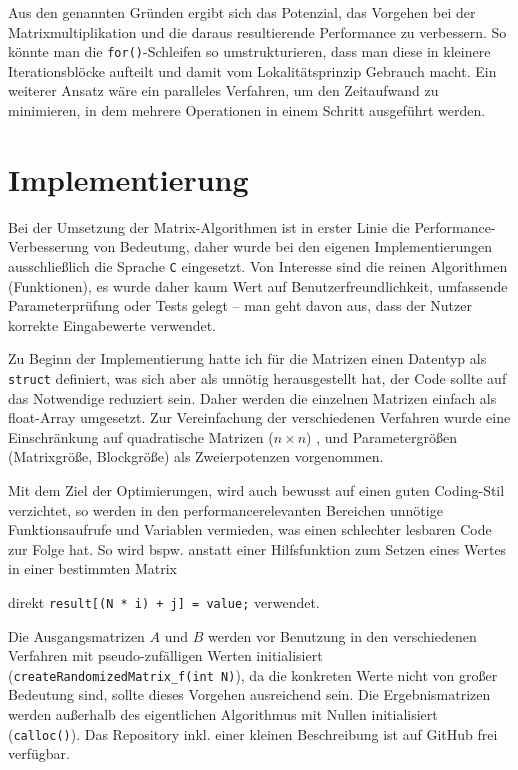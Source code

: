 \documentclass[a4paper,11pt]{scrartcl}
\newcommand{\bspw}{\mbox{bspw.}\xspace}
\newcommand{\inkl}{\mbox{inkl.}\xspace}
\begin{document}
Aus den genannten Gründen ergibt sich das Potenzial, das Vorgehen bei der Matrixmultiplikation
und die daraus resultierende Performance zu verbessern. So könnte man die \texttt{for()}-Schleifen so umstrukturieren, dass man diese in kleinere
Iterationsblöcke aufteilt und damit vom Lokalitätsprinzip Gebrauch macht. Ein weiterer Ansatz wäre
ein paralleles Verfahren, um den Zeitaufwand zu minimieren, in dem mehrere Operationen in einem
Schritt ausgeführt werden.

\section{Implementierung}
Bei der Umsetzung der Matrix-Algorithmen ist in erster Linie die Performance-Verbesserung 
von Bedeutung, daher wurde bei den eigenen Implementierungen ausschließlich die Sprache 
\texttt{C} eingesetzt. Von Interesse sind die reinen Algorithmen (Funktionen), es wurde daher
kaum Wert auf Benutzerfreundlichkeit, umfassende Parameterprüfung oder Tests gelegt --
man geht davon aus, dass der Nutzer korrekte Eingabewerte verwendet.\newline

Zu Beginn der Implementierung hatte ich für die Matrizen einen Datentyp als
\texttt{struct} definiert, was sich aber als unnötig herausgestellt hat, der
Code sollte auf das Notwendige reduziert sein. Daher werden die einzelnen 
Matrizen einfach als float-Array umgesetzt. Zur Vereinfachung der verschiedenen
Verfahren wurde eine Einschränkung auf quadratische Matrizen ($n \times n$) , 
und Parametergrößen (Matrixgröße, Blockgröße) als Zweierpotenzen vorgenommen.\newline

Mit dem Ziel der Optimierungen, wird auch bewusst auf einen guten Coding-Stil verzichtet,
so werden in den performancerelevanten Bereichen unnötige Funktionsaufrufe und Variablen vermieden, was einen schlechter lesbaren Code zur Folge hat. So wird \bspw anstatt einer
Hilfsfunktion zum Setzen eines Wertes in einer bestimmten Matrix


direkt \texttt{result[(N * i) + j] = value;} verwendet.\newline

Die Ausgangsmatrizen $A$ und $B$
werden vor Benutzung in den verschiedenen Verfahren mit pseudo-zufälligen Werten initialisiert
(\texttt{createRandomizedMatrix\_f(int N)}), da die konkreten Werte nicht von großer Bedeutung sind, sollte dieses Vorgehen ausreichend sein. Die Ergebnismatrizen werden außerhalb des eigentlichen
Algorithmus mit Nullen initialisiert (\texttt{calloc()}). Das Repository \inkl einer kleinen
Beschreibung ist auf GitHub \cite{ghub} frei verfügbar.
\end{document}

